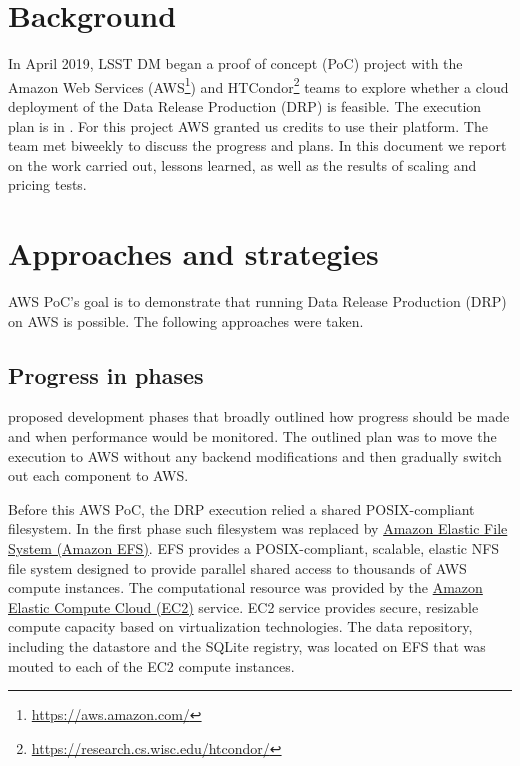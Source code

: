 \newcommand{\poc}{AWS PoC}





\section{Background}

In April 2019, LSST DM began a proof of concept (PoC) project with the Amazon Web Services (AWS\footnote{\url{https://aws.amazon.com/}}) and HTCondor\footnote{\url{https://research.cs.wisc.edu/htcondor/}} teams to explore whether a cloud deployment of the Data Release Production (DRP) is feasible.
The execution plan is in .
For this project AWS granted us credits to use their platform.
The team met biweekly to discuss the progress and plans.
In this document we report on the work carried out, lessons learned, as well as the results of scaling and pricing tests.


\section{Approaches and strategies}

\poc's goal is to demonstrate that running Data Release Production (DRP) on AWS is possible.
The following approaches were taken.

\subsection{Progress in phases}

 proposed development phases that broadly outlined how progress should be made and when performance would be monitored. The outlined plan was to move the execution to AWS without any backend modifications and then gradually switch out each component to AWS.

Before this \poc, the DRP execution relied a shared POSIX-compliant filesystem.
In the first phase such filesystem was replaced by \href{https://aws.amazon.com/efs/}{Amazon Elastic File System (Amazon EFS)}. EFS provides a POSIX-compliant, scalable, elastic NFS file system designed to provide parallel shared access to thousands of AWS compute instances. The computational resource was provided by the \href{https://aws.amazon.com/ec2/}{Amazon Elastic Compute Cloud (EC2)} service. EC2 service provides secure, resizable compute capacity based on virtualization technologies. The data repository, including the datastore and the SQLite registry, was located on EFS that was mouted to each of the EC2 compute instances.

